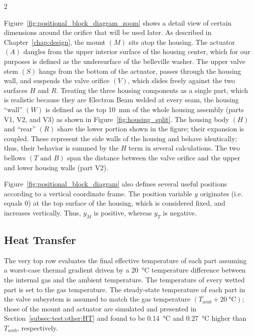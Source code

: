 \documentclass[12pt, letterpaper]{report}%
\newcounter{mycounter}           %
\newcounter{sub}[mycounter]      %
\begin{document}
\begin{appendices}
\begin{multicols}{2}
			\columnbreak
			
			Figure~\ref{fig:positional_block_diagram_zoom} shows a detail view of certain dimensions around the orifice that will be used later.
			As described in Chapter~\ref{chap:design}, the mount $(M)$ sits atop the housing.
			The actuator $(A)$ dangles from the upper interior surface of the housing center, which for our purposes is defined as the undersurface of the belleville washer.
			The upper valve stem $(S)$ hangs from the bottom of the actuator, passes through the housing wall, and suspends the valve orifice $(V)$, which slides freely against the two surfaces $H$ and $R$.
			Treating the three housing components as a single part, which is realistic because they are Electron Beam welded at every seam, the housing ``wall'' $(W)$ is defined as the top \SI{10}{\milli\meter} of the whole housing assembly (parts V1, V2, and V3) as shown in Figure~\ref{fig:housing_split}.
			The housing body $(H)$ and ``rear'' $(R)$ share the lower portion shown in the figure; their expansion is coupled.
			These represent the side walls of the housing and behave identically; thus, their behavior is summed by the $H$ term in several calculations.
			The two bellows $(T \text{ and } B)$ span the distance between the valve orifice and the upper and lower housing walls (part V2).
			
			Figure~\ref{fig:positional_block_diagram} also defines several useful positions according to a vertical coordinate frame. The position variable $y$ originates (i.e. equals $0$) at the top surface of the housing, which is considered fixed, and increases vertically.
			Thus, $y_M$ is positive, whereas $y_T$ is negative.
		\end{multicols}

		\subsection{Heat Transfer}
		\label{app:sat:TF:dT}

			The very top row evaluates the final effective temperature of each part assuming a worst-case thermal gradient driven by a \SI{20}{\degreeCelsius} temperature difference between the internal gas
			and the ambient temperature. The temperature of every wetted part is set to the gas temperature. The steady-state temperature of each part in the valve subsystem is assumed to match the gas temperature
			$(T_{amb} + \SI{20}{\degreeCelsius})$; those of the mount and actuator are simulated and presented in Section~\ref{subsec:test:other:HT} and found to be \SI{0.14}{\degreeCelsius} and \SI{0.27}{\degreeCelsius} higher than $T_{amb}$, respectively.
		

\end{appendices}
\end{document}
